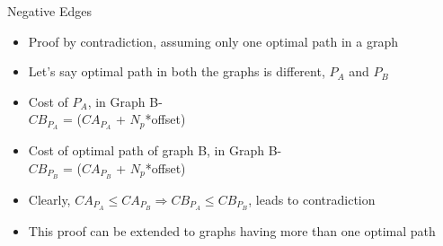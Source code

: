 \documentclass{beamer}
\makeatletter
\newcounter{multipleslide}
\newcommand{\restoreframe}
{
	\patchcmd{\beamer@@tmpl@footline}
	{\themultipleslide}
  	{\insertframenumber}
	{}
	{}
	\setcounter{framenumber}{\value{multipleslide}}
}
\makeatother
\begin{document}
\begin{frame}{Negative Edges}
\begin{itemize}
\item Proof by contradiction, assuming only one optimal path in a graph
\item Let's say optimal path in both the graphs is different, $P_A$ and $P_B$
\item Cost of $P_A$, in Graph B-\\
\hspace*{1cm} $CB_{P_A}$ = ($CA_{P_A}$ + $N_p$*offset)
\item Cost of optimal path of graph B, in Graph B-\\
\hspace*{1cm} $CB_{P_B}$ = ($CA_{P_B}$ + $N_p$*offset)
\item Clearly, $CA_{P_A} \leq CA_{P_B}  \Rightarrow  CB_{P_A} \leq CB_{P_B}$, leads to contradiction
\item This proof can be extended to graphs having more than one optimal path
\end{itemize}
\end{frame}
\restoreframe
\end{document}

